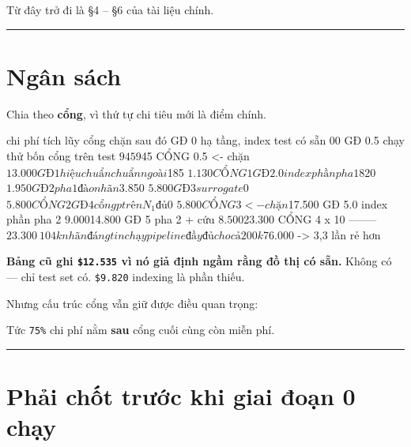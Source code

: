\documentclass[11pt,a4paper]{article}
\begin{document}
Từ đây trở đi là \S{}4 – \S{}6 của tài liệu chính.

\vspace{0.3em}\hrule\vspace{0.6em}

\section{Ngân sách}

Chia theo \textbf{cổng}, vì thứ tự chi tiêu mới là điểm chính.

\begin{dia}
                                        chi phí    tích lũy   cổng chặn sau đó
GĐ 0    hạ tầng, index test có sẵn          $0          $0
GĐ 0.5  chạy thử bốn cổng trên test       $945        $945    CỔNG 0.5  <- chặn $13.000
GĐ 1    hiệu chuẩn chuẩn ngoài            $185      $1.130    CỔNG 1
GĐ 2.0  index phần pha 1                  $820      $1.950
GĐ 2    pha 1 đào nhãn                  $3.850      $5.800
GĐ 3    surrogate                           $0      $5.800    CỔNG 2
GĐ 4    cổng p trên N_1 đủ                   $0      $5.800    CỔNG 3    <- chặn $17.500
GĐ 5.0  index phần pha 2                $9.000     $14.800
GĐ 5    pha 2 + cứu                     $8.500     $23.300    CỔNG 4 x 10
                                      --------
                                       $23.300               ~104k nhãn đáng tin

chạy pipeline đầy đủ cho cả 200k       $76.000               -> 3,3 lần rẻ hơn
\end{dia}

\textbf{Bảng cũ ghi \texttt{\$12.535} vì nó giả định ngầm rằng đồ thị có sẵn.} Không có — chỉ test set có.
\texttt{\$9.820} indexing là phần thiếu.

Nhưng cấu trúc cổng vẫn giữ được điều quan trọng:


Tức \texttt{75\%} chi phí nằm \textbf{sau} cổng cuối cùng còn miễn phí.

\vspace{0.3em}\hrule\vspace{0.6em}

\section{Phải chốt trước khi giai đoạn 0 chạy}
\end{document}
